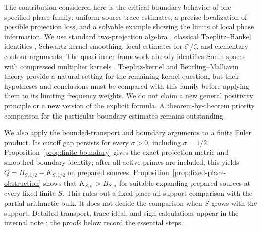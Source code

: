 \documentclass[11pt]{article}
\numberwithin{equation}{section}
\theoremstyle{definition}
\theoremstyle{remark}
\begin{document}
The contribution considered here is the critical-boundary behavior of
one specified phase family: uniform source-trace estimates, a precise
localization of possible projection loss, and a solvable example showing
the limits of local phase information. We use standard two-projection
algebra \cite{Halmos}, classical Toeplitz--Hankel identities
\cite{Peller}, Schwartz-kernel smoothing, local estimates for
\(\zeta'/\zeta\), and elementary contour arguments. The quasi-inner
framework already identifies Sonin spaces with compressed multiplier
kernels \cite[Proposition 5.5]{CCQuasi}. Toeplitz-kernel and
Beurling--Malliavin theory \cite{MPInner,MPBM} provide a natural setting
for the remaining kernel question, but their hypotheses and conclusions
must be compared with this family before applying them to its limiting
frequency weights. We do not claim a new general positivity principle
or a new version of the explicit formula. A theorem-by-theorem priority
comparison for the particular boundary estimates remains outstanding.

We also apply the bounded-transport and boundary arguments to a finite
Euler product. Its cutoff gap persists for every \(\sigma>0\), including
\(\sigma=1/2\). Proposition~\ref{prop:finite-boundary} gives the exact
projection metric and smoothed boundary identity; after all active primes
are included, this yields \(Q=B_{S,1/2}-K_{S,1/2}\) on prepared sources.
Proposition~\ref{prop:fixed-place-obstruction} shows that
\(K_{S,\sigma}>B_{S,\sigma}\) for suitable expanding prepared sources
at every fixed finite \(S\). This rules out a fixed-place all-support
comparison with the partial arithmetic bulk. It does not decide the
comparison when \(S\) grows with the support. Detailed transport,
trace-ideal, and sign calculations appear in the internal note
\cite{FiniteEulerNote}; the proofs below record the essential steps.
\end{document}
